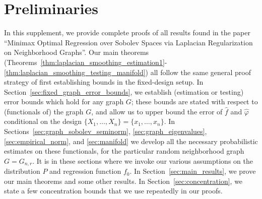 \documentclass[twoside]{article}
\newcommand{\1}{\mathbf{1}}
\newcommand{\wh}[1]{\widehat{#1}}
\theoremstyle{definition}
\theoremstyle{remark}
\begin{document}
	
\runningtitle{}

\onecolumn	
{}


\vspace{4pt}


\section{Preliminaries}
\label{app:preliminaries}
In this supplement, we provide complete proofs of all results found in the paper ``Minimax Optimal Regression over Sobolev Spaces via Laplacian Regularization on Neighborhood Graphs''. 
Our main theorems (Theorems~\ref{thm:laplacian_smoothing_estimation1}-\ref{thm:laplacian_smoothing_testing_manifold}) all follow the same general proof strategy of first establishing bounds in the fixed-design setup. In Section~\ref{sec:fixed_graph_error_bounds}, we establish (estimation or testing) error bounds which hold for any graph $G$; these bounds are stated with respect to (functionals of) the graph $G$, and allow us to upper bound the error of $\wh{f}$ and $\wh{\varphi}$ conditional on the design $\{X_1,\ldots,X_n\} = \{x_1,\ldots,x_n\}$. In Sections~\ref{sec:graph_sobolev_seminorm}, \ref{sec:graph_eigenvalues}, \ref{sec:empirical_norm}, and \ref{sec:manifold} we develop all the necessary probabilistic estimates on these functionals, for the particular random neighborhood graph $G = G_{n,r}$. It is in these sections where we invoke our various assumptions on the distribution $P$ and regression function $f_0$. In Section~\ref{sec:main_results}, we prove our main theorems and some other results. In Section~\ref{sec:concentration}, we state a few concentration bounds that we use repeatedly in our proofs.
\end{document}
